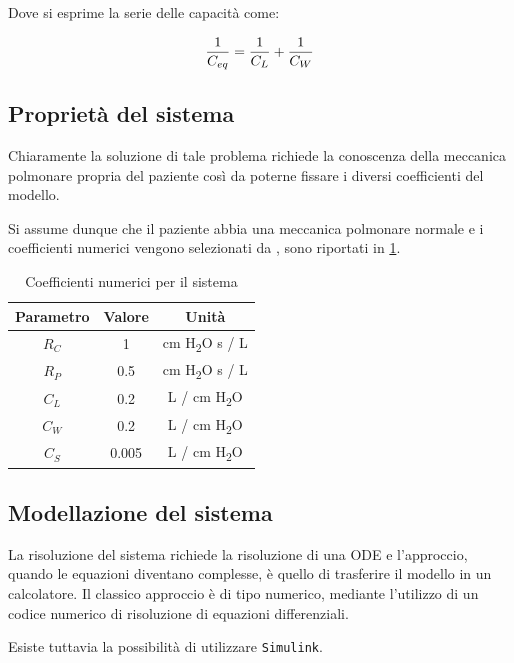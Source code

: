 Dove si esprime la serie delle capacità come: 

\begin{equation}
	{1\over C_{eq}}={1\over C_{L}}+{1\over C_{W}}
\end{equation}



\subsection{Proprietà del sistema}


Chiaramente la soluzione di tale problema richiede la conoscenza della meccanica polmonare propria del paziente così da poterne fissare i diversi coefficienti del modello. 

Si assume dunque che il paziente abbia una meccanica polmonare normale e i coefficienti numerici vengono selezionati da \citeauthor{khoo_physiological_2018} \cite{khoo_physiological_2018}, sono riportati in \cref{tab:coefficienti}.


\begin{table}[h!]
	\centering
	\begin{tabular}{|c|c|c|}
		\hline
		Parametro & Valore & Unità \\ \hline
		$R_C$ & 1 & cm H\textsubscript{2}O s / L \\ \hline
		$R_P$ & 0.5 & cm H\textsubscript{2}O s / L \\ \hline
		$C_L$ & 0.2 & L / cm  H\textsubscript{2}O \\ \hline
		$C_W$ & 0.2 & L / cm  H\textsubscript{2}O \\ \hline
		$C_S$ & 0.005 & L / cm  H\textsubscript{2}O \\ \hline
	\end{tabular}
\caption{Coefficienti numerici per il sistema \cite{khoo_physiological_2018}}
\label{tab:coefficienti}
\end{table}

\subsection{Modellazione del sistema}

La risoluzione del sistema richiede la risoluzione di una ODE e l'approccio, quando le equazioni diventano complesse, è quello di trasferire il modello in un calcolatore. Il classico approccio è di tipo numerico, mediante l'utilizzo di un codice numerico di risoluzione di equazioni differenziali.

Esiste tuttavia la possibilità di utilizzare  \texttt{Simulink}. 

